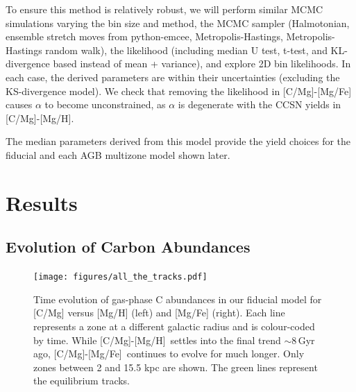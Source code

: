 \documentclass[fleqn,
referee, %
usenatbib]{mnras}
\newcommand{\caah}{[C/Mg]-[Mg/H]}
\newcommand{\caafe}{[C/Mg]-[Mg/Fe]}
\newcommand{\dbnote}[1]{ {\color{Thistle} \textit{\small (DB: #1)}} }
\begin{document}
To ensure this method is relatively robust, we will perform similar MCMC simulations varying the bin size and method, the MCMC sampler (Halmotonian, ensemble stretch moves from python-emcee, Metropolis-Hastings, Metropolis-Hastings random walk), the likelihood (including median U test, t-test, and KL-divergence based instead of mean + variance), and explore 2D bin likelihoods. In each case, the derived parameters are within their uncertainties (excluding the KS-divergence model).  We check that removing the likelihood in \caafe{} causes $\alpha$ to become unconstrained, as $\alpha$ is degenerate with the CCSN yields in \caah.

The median parameters derived from this model provide the yield choices for the fiducial and each AGB multizone model shown later.
\section{Results}\label{sec:results}

\subsection{Evolution of Carbon Abundances}

\begin{figure}
\centering
\texttt{[image: figures/all\_the\_tracks.pdf]}
\caption[]{
    Time evolution of gas-phase C abundances in our fiducial model for [C/Mg] versus [Mg/H] (left) and [Mg/Fe] (right).
    Each line represents a zone at a different galactic radius and is colour-coded by time. While \caah\ settles into the final trend $\sim{8}$\,Gyr ago, \caafe\ continues to evolve for much longer.
    Only zones between 2 and 15.5 kpc are shown. The green lines represent the equilibrium tracks.
}
\label{fig:c_evo}
\end{figure}

\end{document}
